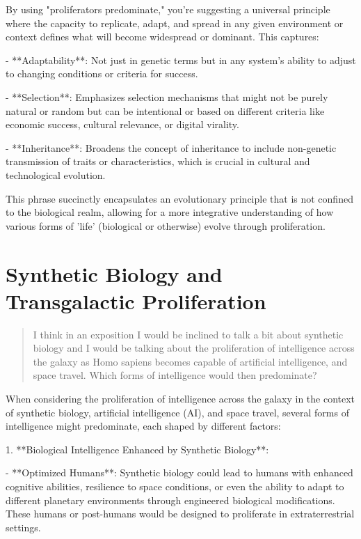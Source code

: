 \documentclass[10pt,titlepage]{book}
\begin{document}
By using "proliferators predominate," you're suggesting a universal principle where the capacity to replicate, adapt, and spread in any given environment or context defines what will become widespread or dominant. This captures:

- **Adaptability**: Not just in genetic terms but in any system's ability to adjust to changing conditions or criteria for success.

- **Selection**: Emphasizes selection mechanisms that might not be purely natural or random but can be intentional or based on different criteria like economic success, cultural relevance, or digital virality.

- **Inheritance**: Broadens the concept of inheritance to include non-genetic transmission of traits or characteristics, which is crucial in cultural and technological evolution.

This phrase succinctly encapsulates an evolutionary principle that is not confined to the biological realm, allowing for a more integrative understanding of how various forms of 'life' (biological or otherwise) evolve through proliferation.

\section{Synthetic Biology and Transgalactic Proliferation}
\begin{quote}
I think in an exposition I would be inclined to talk a bit about synthetic biology and I would be talking about the proliferation of intelligence across the galaxy as Homo sapiens becomes capable of artificial intelligence, and space travel.  Which forms of intelligence would then predominate?
\end{quote}

When considering the proliferation of intelligence across the galaxy in the context of synthetic biology, artificial intelligence (AI), and space travel, several forms of intelligence might predominate, each shaped by different factors:

1. **Biological Intelligence Enhanced by Synthetic Biology**: 

   - **Optimized Humans**: Synthetic biology could lead to humans with enhanced cognitive abilities, resilience to space conditions, or even the ability to adapt to different planetary environments through engineered biological modifications. These humans or post-humans would be designed to proliferate in extraterrestrial settings.
\end{document}
